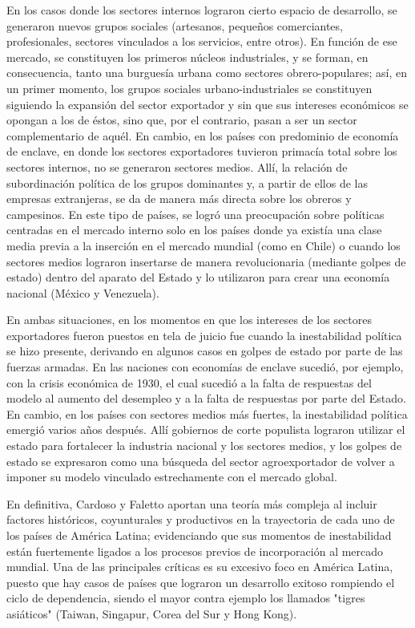 \documentclass{article}
\begin{document}
En los casos donde los sectores internos lograron cierto espacio de desarrollo, se generaron
nuevos grupos sociales (artesanos, pequeños comerciantes, profesionales, sectores vinculados
a los servicios, entre otros). En función de ese mercado, se constituyen los primeros 
núcleos industriales, y se forman, en consecuencia, tanto una burguesía urbana como sectores 
obrero-populares; así, en un primer momento, los grupos sociales urbano-industriales se 
constituyen siguiendo la expansión del sector exportador y sin que sus intereses económicos 
se opongan a los de éstos, sino que, por el contrario, pasan a ser un sector complementario 
de aquél. En cambio, en los países con predominio de economía de enclave, en donde los 
sectores exportadores tuvieron primacía total sobre los sectores internos, no se generaron 
sectores medios. Allí, la relación de subordinación política de los grupos dominantes y, a 
partir de ellos de las empresas extranjeras, se da de manera más directa sobre los obreros y 
campesinos. En este tipo de países, se logró una preocupación sobre políticas centradas en 
el mercado interno solo en los países donde ya existía una clase media previa a la inserción 
en el mercado mundial (como en Chile) o cuando los sectores medios lograron insertarse de manera 
revolucionaria (mediante golpes de estado) dentro del aparato  del Estado y lo utilizaron 
para crear una economía nacional (México y Venezuela).

En ambas situaciones, en los momentos en que los intereses de los sectores exportadores
fueron puestos en tela de juicio fue cuando la inestabilidad política se hizo presente, 
derivando en algunos casos en golpes de estado por parte de las fuerzas armadas. En las
naciones con economías de enclave sucedió, por ejemplo, con la crisis económica de 1930,
el cual sucedió a la falta de respuestas del modelo al aumento del desempleo y a la 
falta de respuestas por parte del Estado. En cambio,
en los países con sectores medios más fuertes, la inestabilidad política emergió varios
años después. Allí gobiernos de corte populista lograron utilizar el estado para fortalecer
la industria nacional y los sectores medios, y los golpes de estado se expresaron como
una búsqueda del sector agroexportador de volver a imponer su modelo vinculado estrechamente
con el mercado global.

En definitiva, Cardoso y Faletto aportan una teoría más compleja al incluir factores
históricos, coyunturales y productivos en la trayectoria de cada uno de los países de 
América Latina; evidenciando que sus momentos de inestabilidad están fuertemente ligados
a los procesos previos de incorporación al mercado mundial. Una de las principales críticas
es su excesivo foco en América Latina, puesto que hay casos de países que lograron un 
desarrollo exitoso rompiendo el ciclo de dependencia, siendo el mayor contra ejemplo los
llamados "tigres asiáticos" (Taiwan, Singapur, Corea del Sur y Hong Kong).
\end{document}
